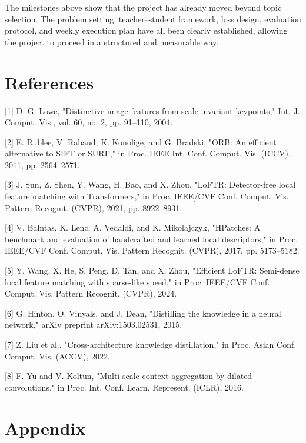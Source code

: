 \documentclass{article}
\begin{document}
The milestones above show that the project has already moved beyond topic selection. The problem setting, teacher--student framework, loss design, evaluation protocol, and weekly execution plan have all been clearly established, allowing the project to proceed in a structured and measurable way.

	
	

\newpage
\section*{References}
\medskip
{
\small


[1] D. G. Lowe, "Distinctive image features from scale-invariant keypoints," Int. J. Comput. Vis., vol. 60, no. 2, pp. 91–110, 2004.



[2] E. Rublee, V. Rabaud, K. Konolige, and G. Bradski, "ORB: An efficient alternative to SIFT or SURF," in Proc. IEEE Int. Conf. Comput. Vis. (ICCV), 2011, pp. 2564–2571.



[3] J. Sun, Z. Shen, Y. Wang, H. Bao, and X. Zhou, "LoFTR: Detector-free local feature matching with Transformers," in Proc. IEEE/CVF Conf. Comput. Vis. Pattern Recognit. (CVPR), 2021, pp. 8922–8931.

[4] V. Balntas, K. Lenc, A. Vedaldi, and K. Mikolajczyk, "HPatches: A benchmark and evaluation of handcrafted and learned local descriptors," in Proc. IEEE/CVF Conf. Comput. Vis. Pattern Recognit. (CVPR), 2017, pp. 5173–5182.

[5] Y. Wang, X. He, S. Peng, D. Tan, and X. Zhou, "Efficient LoFTR: Semi-dense local feature matching with sparse-like speed," in Proc. IEEE/CVF Conf. Comput. Vis. Pattern Recognit. (CVPR), 2024.

[6] G. Hinton, O. Vinyals, and J. Dean, "Distilling the knowledge in a neural network," arXiv preprint arXiv:1503.02531, 2015.

[7] Z. Liu et al., "Cross-architecture knowledge distillation," in Proc. Asian Conf. Comput. Vis. (ACCV), 2022.

[8] F. Yu and V. Koltun, "Multi-scale context aggregation by dilated convolutions," in Proc. Int. Conf. Learn. Represent. (ICLR), 2016.

}

\section*{Appendix}
\end{document}
